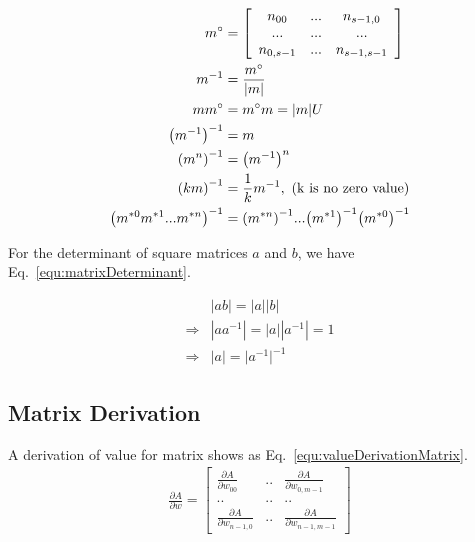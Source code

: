 \documentclass[runningheads,openany]{xhlPaper}
\begin{document}
\begin{equation}
\label{equ:matrixCompanion}
\begin{aligned}
{m^ \circ } &= \left[ {\begin{array}{*{20}{c}}
{{n_{00}}}&{...}&{{n_{s - 1,0}}}\\
{...}&{...}&{...}\\
{{n_{0,s - 1}}}&{...}&{{n_{s - 1,s - 1}}}
\end{array}} \right]\\
{m^{ - 1}} &= \frac{{{m^ \circ }}}{{|m|}}\\
m{m^ \circ } &= {m^ \circ }m = |m|U\\
{\left( {{m^{ - 1}}} \right)^{ - 1}} &= m\\
{\left( {{m^n}} \right)^{ - 1}} &= {\left( {{m^{ - 1}}} \right)^n}\\
{\left( {km} \right)^{ - 1}} &= \frac{1}{k}{m^{ - 1}},\ \left( {{\rm{k\ is\ no\ zero\ value}}} \right)\\
{\left( {{m^{*0}}{m^{*1}}...{m^{*n}}} \right)^{ - 1}} &= {\left( {{m^{*n}}} \right)^{ - 1}}...{\left( {{m^{*1}}} \right)^{ - 1}}{\left( {{m^{*0}}} \right)^{ - 1}}
\end{aligned}
\end{equation}

For the determinant of square matrices $a$ and $b$, we have Eq.~\ref{equ:matrixDeterminant}.

\begin{equation}
\label{equ:matrixDeterminant}
\begin{aligned}
&|ab| = |a||b|\\
\Rightarrow& |a{a^{ - 1}}| = |a||{a^{ - 1}}| = 1\\
 \Rightarrow& |a| = |{a^{ - 1}}{|^{ - 1}}
\end{aligned}
\end{equation}

\subsection{Matrix Derivation}
A derivation of value for matrix shows as Eq.~\ref{equ:valueDerivationMatrix}.
\begin{equation}
\label{equ:valueDerivationMatrix}
\begin{aligned}
\frac{{\partial A}}{{\partial w}} = \begin{bmatrix}
{\frac{{\partial A}}{{\partial {w_{00}}}}}&{..}&{\frac{{\partial A}}{{\partial {w_{0,m - 1}}}}} \\
{..}&{..}&{..} \\
{\frac{{\partial A}}{{\partial {w_{n - 1, 0}}}}}&{..}&{\frac{{\partial A}}{{\partial {w_{n - 1, m - 1}}}}}
\end{bmatrix}
\end{aligned}
\end{equation}
\end{document}
